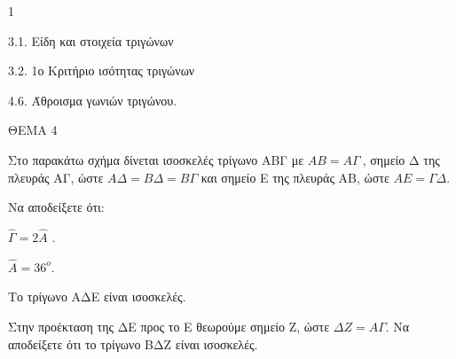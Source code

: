 \begin{ylh}{1}
    \item 3.1. Είδη και στοιχεία τριγώνων
    \item 3.2. 1ο Κριτήριο ισότητας τριγώνων
    \item 4.6. Άθροισμα γωνιών τριγώνου.
\end{ylh}

ΘΕΜΑ 4

Στο παρακάτω σχήμα δίνεται ισοσκελές τρίγωνο ΑΒΓ με $ΑΒ = Α\Gamma\ $, σημείο Δ της πλευράς ΑΓ, ώστε $Α\Delta = Β\Delta = Β\Gamma$ και σημείο Ε της πλευράς ΑΒ, ώστε $ΑΕ = \Gamma\Delta$.

\begin{alist}
\item Να αποδείξετε ότι:

\begin{alist}
\item
  $\widehat{\Gamma} = 2\widehat{Α}$ . 
\item
  $\widehat{Α} = 36^{ο}$. 
\item
  Το τρίγωνο ΑΔΕ είναι ισοσκελές. 

\item Στην προέκταση της ΔΕ προς το Ε θεωρούμε σημείο Ζ, ώστε $\Delta Ζ = Α\Gamma$. Να αποδείξετε ότι το τρίγωνο ΒΔΖ είναι ισοσκελές. 


\begin{center}
\end{center}
\end{alist}
\end{alist}
